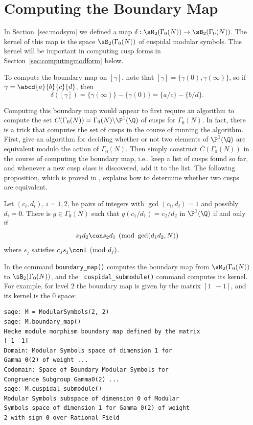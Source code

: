 \section{Computing the Boundary Map}\label{sec:maninboundary}
In Section~\ref{sec:modsym} we defined a map $\delta: \sM_2(\Gamma_0(N)) \to
\sB_2(\Gamma_0(N))$.  The kernel of this map is the space
$\sS_2(\Gamma_0(N))$ of cuspidal modular symbols.  This kernel will be
important in computing cusp forms in Section~\ref{sec:computingmodform}
below.

To compute the boundary map on $[\gamma]$, note
that $[\gamma] = \{\gamma(0),\gamma(\infty)\}$, so 
if $\gamma=\abcd{a}{b}{c}{d}$, then 
$$
  \delta([\gamma]) = \{\gamma(\infty)\} - \{\gamma(0)\}
                   = \{a/c\} - \{b/d\}.
$$

Computing this boundary map would appear to first require an algorithm
to compute the set $C(\Gamma_0(N)) = \Gamma_0(N) \backslash \P^1(\Q)$
of cusps for $\Gamma_0(N)$. In fact, there is a trick that computes the
set of cusps in the course of running the algorithm.  First, give an
algorithm for deciding whether or not two elements of $\P^1(\Q)$ are
equivalent modulo the action of $\Gamma_0(N)$.  Then simply construct
$C(\Gamma_0(N))$ in the course of computing the boundary map, i.e.,
keep a list of cusps found so far, and whenever a new cusp class is
discovered, add it to the list.  The following proposition,
which is proved in \cite[Prop.~2.2.3]{cremona:algs}, explains how to determine
whether two cusps are equivalent.

\begin{proposition}[Cremona]\label{prop:cusp1g0}
Let $(c_i,d_i)$, $i=1,2$, be pairs of 
integers with $\gcd(c_i,d_i)=1$ and possibly
$d_i=0$.
There is $g\in\Gamma_0(N)$ such that 
    $g (c_1/d_1)=c_2/d_2$ in $\P^1(\Q)$ if and only if
 $$s_1 d_2 \con s_2 d_1 \pmod{\gcd(d_1 d_2,N)}$$
where $s_j$ satisfies $c_j s_j\con 1\pmod{d_j}$.
\end{proposition}

In \sage{} the command {\tt boundary\_map()} computes the boundary map from
$\sM_2(\Gamma_0(N))$ to $\sB_2(\Gamma_0(N))$, and the {\tt
  cuspidal\_submodule()} command computes its kernel.  For example,
for level $2$ the boundary map is given by the matrix $[1 \,\,\, -1]$,
and its kernel is the $0$ space:
\begin{verbatim}
sage: M = ModularSymbols(2, 2)
sage: M.boundary_map()
Hecke module morphism boundary map defined by the matrix
[ 1 -1]
Domain: Modular Symbols space of dimension 1 for 
Gamma_0(2) of weight ...
Codomain: Space of Boundary Modular Symbols for 
Congruence Subgroup Gamma0(2) ...
sage: M.cuspidal_submodule()
Modular Symbols subspace of dimension 0 of Modular 
Symbols space of dimension 1 for Gamma_0(2) of weight 
2 with sign 0 over Rational Field
\end{verbatim}

